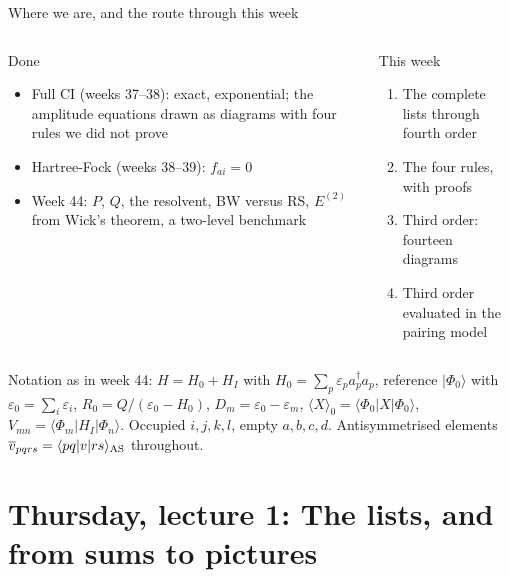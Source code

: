 \documentclass[aspectratio=169,10pt]{beamer}
\newcommand{\mbbox}[1]{%
  \begin{tcolorbox}[colback=paleblue,colframe=uioblue,title={\bfseries Many-body connection}]
  #1
  \end{tcolorbox}}
\newcommand{\ket}[1]{\vert #1\rangle}
\newcommand{\mel}[3]{\langle #1\lvert #2\rvert #3\rangle}
\newcommand{\av}[1]{\langle #1\rangle_0}
\newcommand{\cre}[1]{a_{#1}^{\dagger}}
\newcommand{\ann}[1]{a_{#1}}
\newcommand{\vbar}[4]{\overline v_{#1#2#3#4}}
\newcommand{\ph}{\Phi_0}
\begin{document}
\begin{frame}[shrink=12]{Where we are, and the route through this week}
  \begin{columns}[T]
    \begin{block}{Done}
      \begin{itemize}
        \item Full CI (weeks 37--38): exact, exponential; the amplitude equations drawn as diagrams with four rules we did not prove
        \item Hartree-Fock (weeks 38--39): $f_{ai}=0$
        \item Week 44: $P$, $Q$, the resolvent, BW versus RS, $E^{(2)}$ from Wick's theorem, a two-level benchmark
      \end{itemize}
    \end{block}
    \begin{block}{This week}
      \begin{enumerate}
        \item The complete lists through fourth order
        \item The four rules, with proofs
        \item Third order: fourteen diagrams
        \item Third order evaluated in the pairing model
      \end{enumerate}
    \end{block}
  \end{columns}
  \vspace{0.6em}
  \mbbox{Notation as in week 44: $H=H_0+H_I$ with $H_0=\sum_p\varepsilon_p\cre{p}\ann{p}$, reference $\ket{\ph}$ with $\varepsilon_0=\sum_{i}\varepsilon_i$, $R_0=Q/(\varepsilon_0-H_0)$, $D_m=\varepsilon_0-\varepsilon_m$, $\av{X}=\mel{\ph}{X}{\ph}$, $V_{mn}=\mel{\Phi_m}{H_I}{\Phi_n}$. Occupied $i,j,k,l$, empty $a,b,c,d$. Antisymmetrised elements $\vbar{p}{q}{r}{s}=\langle pq|v|rs\rangle_{\rm AS}$ throughout.}
\end{frame}

\section{Thursday, lecture 1: The lists, and from sums to pictures}
\end{document}
